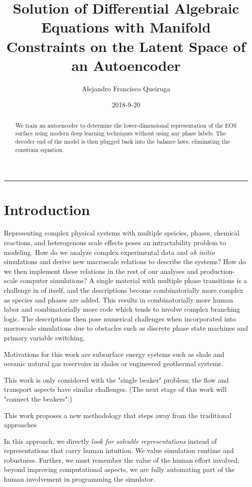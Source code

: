\documentclass[]{article}
\title{Solution of Differential Algebraic Equations with Manifold Constraints
on the Latent Space of an Autoencoder}
\author{Alejandro Francisco Queiruga}
\date{2018-9-20}
\begin{document}
\maketitle
\begin{abstract}
We train an autoencoder to determine the lower-dimensional
representation of the EOS surface using modern deep learning techniques
without using any phase labels. The decoder end of the model is then
plugged back into the balance laws, eliminating the constrain equation.
\end{abstract}

\begin{center}\rule{0.5\linewidth}{\linethickness}\end{center}

\hypertarget{header-n3216}{%
\section{Introduction}\label{header-n3216}}

Representing complex physical systems with multiple speicies, phases,
chemical reactions, and heterogenous scale effects poses an
intractability problem to modeling. How do we analyze complex
experimental data and \emph{ab initio} simulations and derive new
macroscale relations to describe the systems? How do we then implement
these relations in the rest of our analyses and production-scale
computer simulations? A single material with multiple phase transitions
is a challenge in of itself, and the descriptions become combinatorially
more complex as species and phases are added. This results in
combinatorially more human labor and combinatorially more code which
tends to involve complex branching logic. The descriptions then pose
numerical challenges when incorporated into macroscale simulations due
to obstacles such as discrete phase state machines and primary variable
switching.

Motivations for this work are subsurface energy systems such as shale
and oceanic natural gas reservoirs in shales or engineered geothermal
systems.

This work is only considered with the "single beaker" problem; the flow
and transport aspects have similar challenges. (The next stage of this
work will "connect the beakers".)

This work proposes a new methodology that steps away from the
traditional approaches

In this approach, we directly \emph{look for solvable representations}
instead of representations that carry human intuition. We value
simulation runtime and robustness. Further, we must remember the value
of the human effort involved: beyond improving computational aspects, we
are fully automating part of the human involvement in programming the
simulator.
\end{document}
